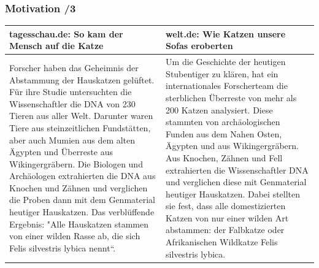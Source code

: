 \begin{frame}
    \frametitle{Motivation /3}
    
    \begin{table}[htp]
    \begin{center}
    \begin{tabular}{p{5cm}p{5cm}}
    \tiny{\textbf{tagesschau.de: So kam der Mensch auf die Katze}} & \tiny{\textbf{welt.de: Wie Katzen unsere Sofas eroberten}} \\
    \hline
    \tiny{Forscher haben das Geheimnis der Abstammung der Hauskatzen gelüftet. Für ihre Studie untersuchten die Wissenschaftler die DNA von 230 Tieren aus aller Welt. Darunter waren Tiere aus steinzeitlichen Fundstätten, aber auch Mumien aus dem alten Ägypten und Überreste aus Wikingergräbern. Die Biologen und Archäologen extrahierten die DNA aus Knochen und Zähnen und verglichen die Proben dann mit dem Genmaterial heutiger Hauskatzen. Das verblüffende Ergebnis: "Alle Hauskatzen stammen von einer wilden Rasse ab, die sich Felis silvestris lybica nennt“.} & \tiny{Um die Geschichte der heutigen Stubentiger zu klären, hat ein internationales Forscherteam die sterblichen Überreste von mehr als 200 Katzen analysiert. Diese stammten von archäologischen Funden aus dem Nahen Osten, Ägypten und aus Wikingergräbern. Aus Knochen, Zähnen und Fell extrahierten die Wissenschaftler DNA und verglichen diese mit Genmaterial heutiger Hauskatzen. Dabei stellten sie fest, dass alle domestizierten Katzen von nur einer wilden Art abstammen: der Falbkatze oder Afrikanischen Wildkatze Felis silvestris lybica.}\\
    
    \end{tabular}
    \end{center}
    \end{table}%
\end{frame}
    
    
